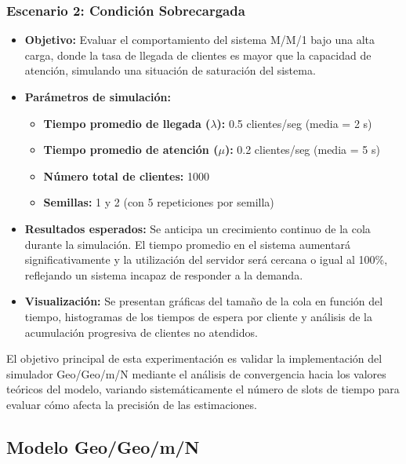 \documentclass{article}
\begin{document}
\subsubsection{Escenario 2: Condición Sobrecargada}

\begin{itemize}
    \item \textbf{Objetivo:} Evaluar el comportamiento del sistema M/M/1 bajo una alta carga, donde la tasa de llegada de clientes es mayor que la capacidad de atención, simulando una situación de saturación del sistema.

    \item \textbf{Parámetros de simulación:}
    \begin{itemize}
        \item \textbf{Tiempo promedio de llegada ($\lambda$):} 0.5 clientes/seg (media = 2 s)
        \item \textbf{Tiempo promedio de atención ($\mu$):} 0.2 clientes/seg (media = 5 s)
        \item \textbf{Número total de clientes:} 1000
        \item \textbf{Semillas:} 1 y 2 (con 5 repeticiones por semilla)
    \end{itemize}

    \item \textbf{Resultados esperados:} 
    Se anticipa un crecimiento continuo de la cola durante la simulación. El tiempo promedio en el sistema aumentará significativamente y la utilización del servidor será cercana o igual al 100\%, reflejando un sistema incapaz de responder a la demanda.

    \item \textbf{Visualización:} 
    Se presentan gráficas del tamaño de la cola en función del tiempo, histogramas de los tiempos de espera por cliente y análisis de la acumulación progresiva de clientes no atendidos.

\end{itemize}

El objetivo principal de esta experimentación es validar la implementación del simulador Geo/Geo/m/N mediante el análisis de convergencia hacia los valores teóricos del modelo, variando sistemáticamente el número de slots de tiempo para evaluar cómo afecta la precisión de las estimaciones.
\subsection{Modelo Geo/Geo/m/N}
\end{document}
